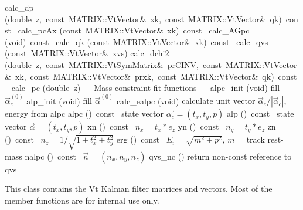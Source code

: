 \documentclass{article}
\begin{document}
\begin{cxxentry}
\begin{cxxclass}
\begin{cxxpublic}
        {}
\label{cxx.1.3.42}
        {calc\_dp}
        {(double\ z,\ const\ MATRIX::VtVector\&\ xk,\ const\ MATRIX::VtVector\&\ qk)\ const\ }
        {}
        {}
\label{cxx.1.3.43}
        {calc\_pcAx}
        {(const\ MATRIX::VtVector\&\ xk)\ const\ }
        {}
        {}
\label{cxx.1.3.44}
        {calc\_AGpc}
        {(void)\ const\ }
        {}
        {}
\label{cxx.1.3.45}
        {calc\_qk}
        {(const\ MATRIX::VtVector\&\ xk)\ const\ }
        {}
        {}
\label{cxx.1.3.46}
        {calc\_qvs}
        {(const\ MATRIX::VtVector\&\ xvs)}
        {}
        {}
\label{cxx.1.3.47}
        {calc\_dchi2}
        {(double\ z,\ const\ MATRIX::VtSymMatrix\&\ prCINV,\ const\ MATRIX::VtVector\&\ xk,\ const\ MATRIX::VtVector\&\ prxk,\ const\ MATRIX::VtVector\&\ qk)\ const\ }
        {}
        {}
\label{cxx.1.3.48}
        {calc\_pc}
        {(double\ z)}
        {}
        {}
\label{cxx.1.3.49}
\cxxitem{}
        {--- Mass constraint fit functions --- }
        {}
        {}
        {}
\label{cxx.1.3.50}
        {alpc\_init}
        {(void)}
        { fill $\vec{\alpha}_c^{(0)}$}
        {}
\label{cxx.1.3.51}
        {alp\_init}
        {(void)}
        { fill $\vec{\alpha}^{(0)}$}
        {}
\label{cxx.1.3.52}
        {calc\_ealpc}
        {(void)}
        { calculate unit vector $\vec{\alpha}_c/|\vec{\alpha}_c|$, energy from alpc}
        {}
\label{cxx.1.3.53}
        {alpc}
        {()\ const\ }
        { state vector $\vec{\alpha_c}=(t_x,t_y,p)$}
        {}
\label{cxx.1.3.54}
        {alp}
        {()\ const\ }
        { state vector $\vec{\alpha}=(t_x,t_y,p)$}
        {}
\label{cxx.1.3.55}
        {xn}
        {()\ const\ }
        { $n_x = t_x * e_z$}
        {}
\label{cxx.1.3.56}
        {yn}
        {()\ const\ }
        { $n_y = t_y * e_z$}
        {}
\label{cxx.1.3.57}
        {zn}
        {()\ const\ }
        { $n_z = 1/\sqrt{1 + t_x^2 + t_y^2}$}
        {}
\label{cxx.1.3.58}
        {erg}
        {()\ const\ }
        { $E_i=\sqrt{m^2 + p^2}$, $m$ = track rest-mass}
        {}
\label{cxx.1.3.59}
        {nalpc}
        {()\ const\ }
        { $\vec{n} = (n_x,n_y,n_z)$}
        {}
\label{cxx.1.3.60}
        {qvs\_nc}
        {()}
        { return non-const reference to qvs}
        {}
\label{cxx.1.3.61}
\end{cxxpublic}
\begin{cxxdoc}
This class contains the Vt Kalman filter matrices and vectors. Most
of the member functions are for internal use only.


\end{cxxdoc}
\end{cxxclass}
\end{cxxentry}
\end{document}

